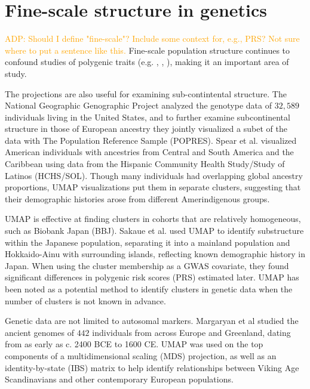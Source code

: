 \documentclass[12pt]{article}
\newcommand{\adpcomment}[1]{{\textcolor{orange}{ADP: #1}}}
\begin{document}
\section*{Fine-scale structure in genetics}
\adpcomment{Should I define "fine-scale"? Include some context for, e.g., PRS? Not sure where to put a sentence like this.}
Fine-scale population structure continues to confound studies of polygenic traits (e.g. \cite{kerminen2019geographic}, \cite{berg2019reduced}, \cite{sohail2019polygenic}), making it an important area of study.

The projections are also useful for examining sub-contintental structure. The National Geographic Genographic Project analyzed the genotype data of $32,589$ individuals living in the United States\cite{dai_population_2020}, and to further examine subcontinental structure in those of European ancestry they jointly visualized a subet of the data with The Population Reference Sample (POPRES)\cite{nelson2008population}. Spear et al. visualized American individuals with ancestries from Central and South America and the Caribbean using data from the Hispanic Community Health Study/Study of Latinos (HCHS/SOL)\cite{sorlie2010design}. Though many individuals had overlapping global ancestry proportions, UMAP visualizations put them in separate clusters, suggesting that their demographic histories arose from different Amerindigenous groups\cite{spear2020recent}.

UMAP is effective at finding clusters in cohorts that are relatively homogeneous, such as Biobank Japan (BBJ)\cite{nagai2017overview}. Sakaue et al.\cite{sakaue_dimensionality_2020} used UMAP to identify substructure within the Japanese population, separating it into a mainland population and Hokkaido-Ainu with surrounding islands, reflecting known demographic history in Japan. When using the cluster membership as a GWAS covariate, they found significant differences in polygenic risk scores (PRS) estimated later. UMAP has been noted as a potential method to identify clusters in  genetic data when the number of clusters is not known in advance\cite{tonkin-hill_fast_2019}.

Genetic data are not limited to autosomal markers. Margaryan et al\cite{margaryan_population_2019} studied the ancient genomes of $442$ individuals from across Europe and Greenland, dating from as early as c. 2400 BCE to 1600 CE. UMAP was used on the top components of a multidimensional scaling (MDS) projection, as well as an identity-by-state (IBS) matrix to help identify relationships between Viking Age Scandinavians and other contemporary European populations. 
\end{document}
